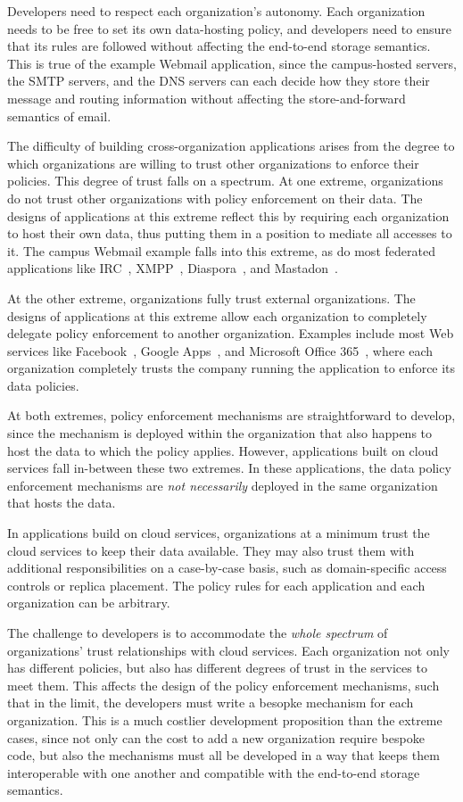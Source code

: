 Developers need to respect each organization's autonomy.
Each organization needs to be free to
set its own data-hosting policy, and developers need to ensure that its
rules are followed without affecting the end-to-end storage semantics.
This is true of the example Webmail application, since the campus-hosted
servers, the SMTP servers, and the DNS servers can each
decide how they store their message and routing information
without affecting the store-and-forward semantics of email.

The difficulty of building cross-organization applications arises from the
degree to which organizations are willing to trust other organizations to enforce
their policies.  This degree of trust falls on a spectrum.
At one extreme, organizations do not trust other organizations with policy
enforcement on their data.  The designs of applications at this extreme reflect this by requiring
each organization to host their own data, thus putting them in a position to
mediate all accesses to it.
The campus Webmail example falls into this extreme, as do most federated
applications like IRC~\cite{irc}, XMPP~\cite{xmpp},
Diaspora~\cite{diaspora}, and Mastadon~\cite{mastadon}.

At the other extreme,
organizations fully trust external organizations.
The designs of applications at this extreme allow each organization to completely delegate
policy enforcement to another organization.  Examples include most Web services like 
Facebook~\cite{facebook}, Google Apps~\cite{gapps}, and Microsoft
Office 365~\cite{microsoft-apps}, where each organization completely trusts the company running
the application to enforce its data policies.

At both extremes, policy enforcement mechanisms are
straightforward to develop, since the mechanism is deployed within the
organization that also happens to host the data to which the policy
applies.  However, applications built on cloud services
fall in-between these two extremes.  In these applications, the data policy
enforcement mechanisms are \emph{not necessarily} deployed in the same
organization that hosts the data.

In applications build on cloud services, organizations
at a minimum trust the cloud services to keep their data available.
They may also trust them with additional
responsibilities on a case-by-case basis,
such as domain-specific access controls or replica placement.
The policy rules for each application and each organization can be arbitrary.

The challenge to developers is to accommodate the \emph{whole spectrum} of
organizations' trust relationships with cloud services.
Each organization not only has different
policies, but also has different degrees of trust in the services to meet them.
This affects the design of the policy enforcement mechanisms, such that
in the limit, the developers must write a besopke mechanism
for each organization.  This is a much costlier development proposition than the extreme
cases, since not only can the cost to add a new organization require bespoke
code, but also the mechanisms must all be developed in a way that keeps them
interoperable with one another and compatible with the end-to-end storage
semantics.

